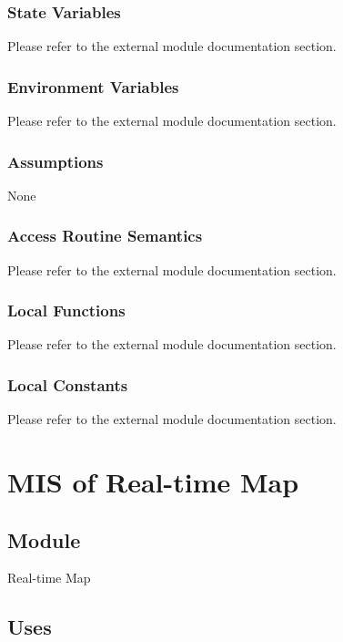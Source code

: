 \documentclass[12pt, titlepage]{article}
\begin{document}
\subsubsection{State Variables}

Please refer to the external module documentation section.

\subsubsection{Environment Variables}

Please refer to the external module documentation section.

\subsubsection{Assumptions}

None

\subsubsection{Access Routine Semantics}

Please refer to the external module documentation section.

\subsubsection{Local Functions}

Please refer to the external module documentation section.

\subsubsection{Local Constants}

Please refer to the external module documentation section.
 
\newpage

\section{MIS of Real-time Map} \label{mRealTimeMap}

\subsection{Module}

Real-time Map

\subsection{Uses}
\end{document}
